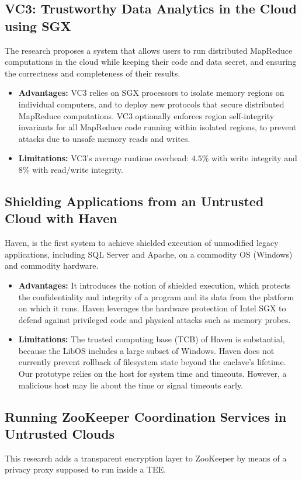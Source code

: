 \documentclass[conference]{IEEEtran}
\begin{document}
\subsection{VC3: Trustworthy Data Analytics in the Cloud using SGX }
\cite{cloud2} The research proposes a system that allows users to run distributed MapReduce computations in the cloud while keeping their code and data secret, and ensuring the correctness and completeness of their results.
\begin{itemize}
    \item \textbf{Advantages:} VC3 relies on SGX processors to isolate memory regions on individual computers, and to deploy new protocols that secure distributed MapReduce computations. VC3 optionally enforces region self-integrity invariants for all MapReduce code running within isolated regions, to prevent attacks due to unsafe memory reads and writes.
    \item \textbf{Limitations:} VC3’s average runtime overhead: $4.5\%$ with write integrity and $8\%$ with read/write integrity.
\end{itemize}


\subsection{Shielding Applications from an Untrusted Cloud with Haven }
\cite{cloud3} Haven, is the first system to achieve shielded execution of unmodified legacy applications, including SQL Server and Apache, on a commodity OS (Windows) and commodity hardware.
\begin{itemize}
    \item \textbf{Advantages:} It introduces the notion of shielded execution, which protects the confidentiality and integrity of a program and its data from the platform on which it runs. Haven leverages the hardware protection of Intel SGX to defend against privileged code and physical attacks such as memory probes.
    \item \textbf{Limitations:} The trusted computing base (TCB) of Haven is substantial, because the LibOS includes a large subset of Windows. Haven does not currently prevent rollback of filesystem state beyond the enclave’s lifetime. Our prototype relies on the host for system time and timeouts. However, a malicious host may lie about the time or signal timeouts early.
\end{itemize}


\subsection{Running ZooKeeper Coordination Services in Untrusted Clouds }
\cite{cloud4} This research adds a transparent encryption layer to ZooKeeper by means of a privacy proxy supposed to run inside a TEE.
\end{document}
